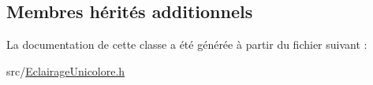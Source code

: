 \subsection*{Membres hérités additionnels}


La documentation de cette classe a été générée à partir du fichier suivant \+:\begin{DoxyCompactItemize}
\item 
src/\hyperlink{EclairageUnicolore_8h}{Eclairage\+Unicolore.\+h}\end{DoxyCompactItemize}
